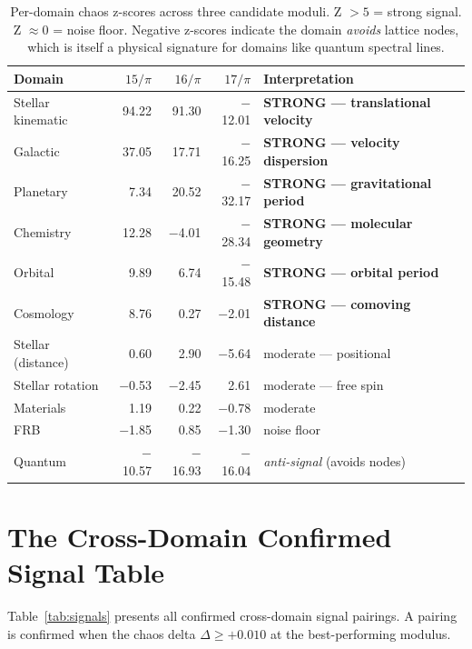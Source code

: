 \documentclass[11pt, letterpaper, openany]{book}
\begin{document}
\begin{table}[H]
\centering
\renewcommand{\arraystretch}{1.4}
\begin{tabular}{|l|r|r|r|l|}
\hline
\textbf{Domain} & \textbf{$15/\pi$} & \textbf{$16/\pi$} & \textbf{$17/\pi$} & \textbf{Interpretation} \\
\hline\hline
Stellar kinematic & 94.22 & 91.30 & $-$12.01 & \textbf{STRONG --- translational velocity} \\
Galactic & 37.05 & 17.71 & $-$16.25 & \textbf{STRONG --- velocity dispersion} \\
Planetary & 7.34 & 20.52 & $-$32.17 & \textbf{STRONG --- gravitational period} \\
Chemistry & 12.28 & $-$4.01 & $-$28.34 & \textbf{STRONG --- molecular geometry} \\
Orbital & 9.89 & 6.74 & $-$15.48 & \textbf{STRONG --- orbital period} \\
Cosmology & 8.76 & 0.27 & $-$2.01 & \textbf{STRONG --- comoving distance} \\
Stellar (distance) & 0.60 & 2.90 & $-$5.64 & moderate --- positional \\
Stellar rotation & $-$0.53 & $-$2.45 & 2.61 & moderate --- free spin \\
Materials & 1.19 & 0.22 & $-$0.78 & moderate \\
FRB & $-$1.85 & 0.85 & $-$1.30 & noise floor \\
Quantum & $-$10.57 & $-$16.93 & $-$16.04 & \textit{anti-signal} (avoids nodes) \\
\hline
\end{tabular}
\caption{Per-domain chaos z-scores across three candidate moduli. Z $> 5$ = strong signal. Z $\approx 0$ = noise floor. Negative z-scores indicate the domain \emph{avoids} lattice nodes, which is itself a physical signature for domains like quantum spectral lines.}
\label{tab:zscores}
\end{table}

\section*{The Cross-Domain Confirmed Signal Table}

Table~\ref{tab:signals} presents all confirmed cross-domain signal pairings. A pairing is
confirmed when the chaos delta $\Delta \geq +0.010$ at the best-performing modulus.
\end{document}
